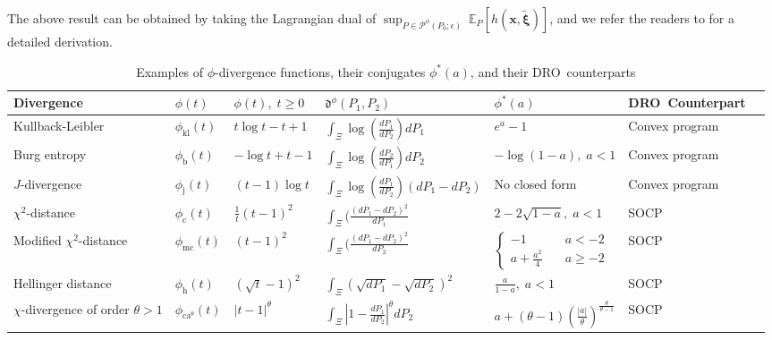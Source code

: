 \documentclass[final,onefignum,onetabnum]{class}
\newcommand{\ee}[2]{\mathbb{E}_{#1} \left[ #2 \right]}
\newcommand{\bs}[1]{\boldsymbol{#1}} %
\newcommand{\Cs}[1]{\mathcal{#1}} %
\newcommand{\Fs}[1]{\mathfrak{#1}} %
\newcommand{\txi}{\tilde{\bs{\xi}}}
\newcommand{\dro}{DRO}
\begin{document}
The above result can be obtained by taking the Lagrangian dual of   \linebreak $\sup_{P \in \Cs{P}^{\phi}(P_{0};\epsilon)} \ \ee{P}{h(\bs{x},\txi)}$, and  we refer the readers to \citet{ben2013,bayraksan2015,love2013} for a detailed derivation. 

\begin{table}[!]
\footnotesize
\centering
\caption{Examples of $\phi$-divergence functions, their conjugates $\phi^{*}(a)$, and their \dro\ counterparts}
\begin{adjustbox}{max width=\textwidth}
\begin{tabular}{lllllll}
\toprule
Divergence  & $\phi(t)$  & $\phi(t), \; t \ge 0$  & $\Fs{d}^{\phi}(P_{1}, P_{2})$ & $\phi^{*}(a)$ & \dro\ Counterpart\\
\midrule
Kullback-Leibler    & $\phi_{\text{kl}}(t)$ & $t \log t -t +1$  & $\int_{\Xi} \log\left(\frac{d P_{1}}{d P_{2}}\right) d P_{1}$   &   $e^{a}-1$ & Convex program\\
Burg entropy & $\phi_{\text{b}}(t)$  & $- \log t + t -1 $ & $\int_{\Xi} \log\left(\frac{d P_{2}}{d P_{1}}\right) d P_{2}$   & $-\log(1-a), \; a<1$  & Convex program\\
$J$-divergence & $\phi_{\text{j}}(t)$  & $(t-1) \log t$      & $\int_{\Xi} \log\left(\frac{d P_{1}}{d P_{2}}\right) (d P_{1} - d P_{2})$ & No closed form  & Convex program\\
$\chi^{2}$-distance      & $\phi_{\text{c}}(t)$  & $\frac{1}{t}(t-1)^{2}$     & $\int_{\Xi} (\frac{(d P_{1} - d P_{2})^{2}}{d P_{1}}$  & $2-2\sqrt{1-a}, \; a<1$  & SOCP\\
Modified $\chi^{2}$-distance   & $\phi_{\text{mc}}(t)$ & $(t-1)^{2}$     & $\int_{\Xi} (\frac{(d P_{1} - d P_{2})^{2}}{d P_{2}}$   & $\begin{cases}
-1 \quad & a<-2\\
a +\frac{a^{2}}{4} \quad & a \ge -2
\end{cases}$  & SOCP\\
Hellinger distance    & $\phi_{\text{h}}(t)$  & $(\sqrt{t}-1)^{2}$     & $\int_{\Xi} (\sqrt{d P_{1}} - \sqrt{d P_{2}})^{2}$    & $\frac{a}{1-a}, \; a<1$ & SOCP\\
$\chi$-divergence of order $\theta>1$ & $\phi_{\text{ca}^{\theta}}(t)$ & $|t-1|^{\theta}$                                          & $\int_{\Xi} |1- \frac{d P_{1}}{d P_{2}}|^{\theta}d P_{2}$      & $a+(\theta-1)\left(\frac{|a|}{\theta}\right)^{\frac{\theta}{\theta-1}}$ & SOCP\\

\end{tabular}
\end{adjustbox}
\end{table}
\end{document}
